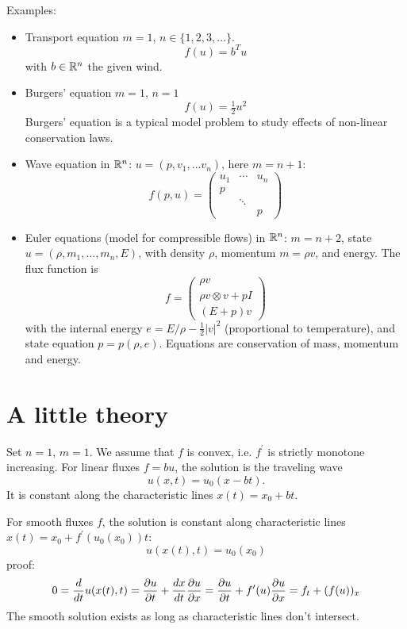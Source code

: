 \noindent
Examples:
\begin{itemize}
\item Transport equation $m = 1$, $n \in \{ 1, 2, 3, \ldots \}$. 
$$
f(u) = b^T u
$$
with $b \in {\mathbb R}^n$ the given wind.

\item Burgers' equation $m = 1$, $n = 1$
$$
f(u) = \tfrac{1}{2} u^2
$$
Burgers' equation is a typical model problem to study effects of
non-linear conservation laws.

\item Wave equation in ${\mathbb R}^n$:  $u = (p, v_1, \ldots v_n)$, here $m
  = n+1$:
$$
f(p,u) = \left( \begin{array}{ccc}
   u_1 & \cdots & u_n \\
  p & & \\
  & \ddots & \\
  & & p
  \end{array} \right)
$$

\item Euler equations (model for compressible flows) in ${\mathbb R}^n$: $m
  = n+2$, state $u = (\rho, m_1, \ldots, m_n, E)$,
  with density $\rho$, momentum $m = \rho v$, and energy. The flux
  function is 
$$
f = \left( \begin{array}{c} \rho v \\  
   \rho v \otimes v + p I \\
   (E + p) v   \end{array} \right)
$$
with the internal energy $e = E/\rho - \tfrac{1}{2} |v|^2$
(proportional to temperature), and state equation $p = p(\rho,
e)$. Equations are conservation of mass, momentum and energy.
\end{itemize}


\section{A little theory}

Set $n = 1$, $m = 1$. We assume that $f$ is convex,
i.e. $f^\prime$ is strictly monotone increasing. For linear fluxes $f = b u$, the solution
is the traveling wave
$$
u(x,t) = u_0(x-bt).
$$
It is constant along the characteristic lines $x(t) = x_0 + bt$.

\medskip

For smooth fluxes $f$, the solution is constant along characteristic lines
$x(t) = x_0 + f^\prime (u_0(x_0)) t$:
$$
u(x(t), t) = u_0(x_0)
$$
proof:
$$
0 = \frac{d}{dt} u(x(t), t) = \frac{\partial u}{\partial t} +
        \frac{d x}{dt} \frac{\partial u}{\partial x} \\
 =  \frac{\partial u}{\partial t} + f^\prime(u) \frac{\partial
       u}{\partial x} 
= f_t + (f(u))_x
$$
The smooth solution exists as long as characteristic lines don't
intersect.

